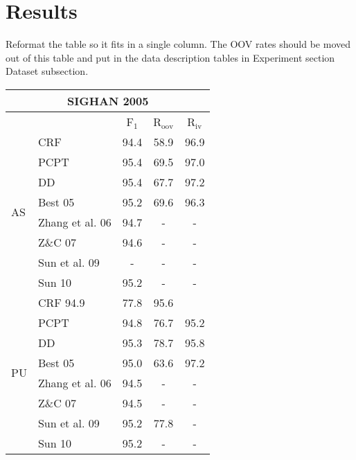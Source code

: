 \section{Results}

Reformat the table so it fits in a single column. 
The OOV rates should be moved out of this table and put in the data description tables in Experiment section Dataset subsection.

\begin{table}
\centering
\begin{small}
\begin{tabular}{ l | l | c | c | c   }
\multicolumn{5}{c}{\large{SIGHAN 2005}} \\
\hline
    \multicolumn{2}{c}{}  & \multicolumn{1}{c}{F$_1$}   &   \multicolumn{1}{c|}{R$_{\mathrm{oov}}$}    &  \multicolumn{1}{c}{R$_{\mathrm{iv}}$}   \\ 
\hline
\multirow{8}{*}{AS} &  CRF       & 94.4  &  58.9 & 96.9 \\
 & PCPT                                       & 95.4  & 69.5 & 97.0 \\ 
& DD                                        & {95.4}  & {67.7} & {97.2} \\
\cline{2-5}
& Best 05      & 95.2 &   69.6 &  96.3 \\
& Zhang et al. 06      & 94.7 &   - & - \\
& Z\&C 07      & 94.6 &   - & - \\
& Sun et al. 09      & -  &  -  & - \\
& Sun 10      & 95.2  &   -  & - \\
\hline


\multirow{8}{*}{PU} &   CRF     94.9  &   77.8 &  95.6 \\
& PCPT & 94.8  &  76.7 &  95.2 \\
& DD  & {95.3}  &  {78.7} &95.8 \\
\cline{2-5}
& Best 05     &  95.0   &  63.6 &  {97.2} \\
& Zhang et al. 06      & 94.5 &   - & - \\
& Z\&C 07      & 94.5 &   - & - \\
& Sun et al. 09     & 95.2  &  77.8  & - \\
& Sun 10     & 95.2  &   -  & - \\
\hline


\end{tabular}
\end{small}
\end{table}
